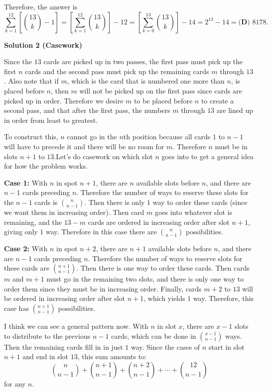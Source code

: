 \begin{enumerate}
 Therefore, the answer is 
 \[\sum_{k=1}^{12}\left[\binom{13}{k}-1\right] = \left[\sum_{k=1}^{12}\binom{13}{k}\right]-12 = \left[\sum_{k=0}^{13}\binom{13}{k}\right]-14 = 2^{13} - 14 = \boxed{\textbf{(D) } 8178}.\]




\textbf{Solution 2 (Casework)}

Since the $13$ cards are picked up in two passes, the first pass must pick up the first $n$ cards and the second pass must pick up the remaining cards $m$ through $13$. Also note that if $m$, which is the card that is numbered one more than $n$, is placed before $n$, then $m$ will not be picked up on the first pass since cards are picked up in order. Therefore we desire $m$ to be placed before $n$ to create a second pass, and that after the first pass, the numbers $m$ through $13$ are lined up in order from least to greatest.

 To construct this, $n$ cannot go in the $n$th position because all cards $1$ to $n-1$ will have to precede it and there will be no room for $m$. Therefore $n$ must be in slots $n+1$ to $13$.Let's do casework on which slot $n$ goes into to get a general idea for how the problem works.

 \textbf{Case 1:} With $n$ in spot $n+1$, there are $n$ available slots before $n$, and there are $n-1$ cards preceding $n$. Therefore the number of ways to reserve these slots for the $n-1$ cards is $\binom{n}{n-1}$. Then there is only $1$ way to order these cards (since we want them in increasing order). Then card $m$ goes into whatever slot is remaining, and the $13-m$ cards are ordered in increasing order after slot $n+1$, giving only $1$ way. Therefore in this case there are $\binom{n}{n-1}$ possibilities.

 \textbf{Case 2:} With $n$ in spot $n+2$, there are $n+1$ available slots before $n$, and there are $n-1$ cards preceding $n$. Therefore the number of ways to reserve slots for these cards are $\binom{n+1}{n-1}$. Then there is one way to order these cards. Then cards $m$ and $m+1$ must go in the remaining two slots, and there is only one way to order them since they must be in increasing order. Finally, cards $m+2$ to $13$ will be ordered in increasing order after slot $n+1$, which yields $1$ way. Therefore, this case has $\binom{n+1}{n-1}$ possibilities.

 I think we can see a general pattern now. With $n$ in slot $x$, there are $x-1$ slots to distribute to the previous $n-1$ cards, which can be done in $\binom{x-1}{n-1}$ ways. Then the remaining cards fill in in just $1$ way. Since the cases of $n$ start in slot $n+1$ and end in slot $13$, this sum amounts to:
 \[\binom{n}{n-1}+\binom{n+1}{n-1}+\binom{n+2}{n-1} + \cdots + \binom{12}{n-1}\] for any $n$.


\end{enumerate}
